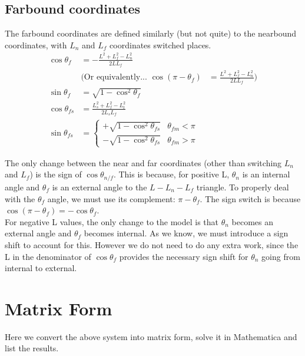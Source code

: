 \documentclass[11pt,twocolumn]{article}
\begin{document}
\subsection{Farbound coordinates}
The farbound coordinates are defined similarly (but not quite) to the nearbound coordinates, with
$L_n$ and $L_f$ coordinates switched places.
\begin{align}
  \cos\theta_f &= -\frac{L^2 + L_f^2 - L_n^2}{2L L_f}\\
  &\Bigg( \mbox{Or equivalently...   }
  \cos\left(\pi - \theta_f\right) &= \frac{L^2 + L_f^2 - L_n^2}{2L L_f}\Bigg)\\
  \sin\theta_{f} &= \sqrt{1 - \cos^2\theta_{f}} \\
  \cos\theta_{fs} &= \frac{L_s^2 + L_f^2 - L_t^2}{2L_s L_f} \\
  \sin\theta_{fs} &=
  \begin{cases}
    +\sqrt{1 - \cos^2\theta_{fs}} & \theta_{fm} < \pi \\
    -\sqrt{1 - \cos^2\theta_{fs}} & \theta_{fm} > \pi
  \end{cases}
\end{align}

The only change between the near and far coordinates (other than switching $L_n$ and $L_f$) is the
sign of $\cos\theta_{n/f}$. This is because, for positive L, $\theta_n$ is an internal angle and
$\theta_f$ is an external angle to the $L-L_n-L_f$ triangle. To properly deal with the $\theta_f$
angle, we must use its complement: $\pi - \theta_f$. The sign switch is because
$\cos\left(\pi - \theta_f\right) = -\cos\theta_f$.\\

For negative L values, the only change to the model is that $\theta_n$ becomes an external angle and
$\theta_f$ becomes internal. As we know, we must introduce a sign shift to account for this.
However we do not need to do any extra work, since the L in the denominator of $\cos\theta_f$
provides the necessary sign shift for $\theta_n$ going from internal to external.

\onecolumn

\section{Matrix Form}
Here we convert the above system into matrix form, solve it in Mathematica and list the results.
\end{document}
